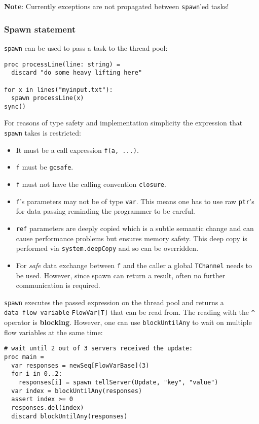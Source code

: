 \textbf{Note}: Currently exceptions are not propagated between
\texttt{spawn}'ed tasks!

\hypertarget{spawn-statement}{%
\subsubsection{Spawn statement}\label{spawn-statement}}

\texttt{spawn} can be used to pass a task to the thread pool:

\begin{verbatim}
proc processLine(line: string) =
  discard "do some heavy lifting here"

for x in lines("myinput.txt"):
  spawn processLine(x)
sync()
\end{verbatim}

For reasons of type safety and implementation simplicity the expression
that \texttt{spawn} takes is restricted:

\begin{itemize}
\tightlist
\item
  It must be a call expression \texttt{f(a,\ ...)}.
\item
  \texttt{f} must be \texttt{gcsafe}.
\item
  \texttt{f} must not have the calling convention \texttt{closure}.
\item
  \texttt{f}'s parameters may not be of type \texttt{var}. This means
  one has to use raw \texttt{ptr}'s for data passing reminding the
  programmer to be careful.
\item
  \texttt{ref} parameters are deeply copied which is a subtle semantic
  change and can cause performance problems but ensures memory safety.
  This deep copy is performed via \texttt{system.deepCopy} and so can be
  overridden.
\item
  For \emph{safe} data exchange between \texttt{f} and the caller a
  global \texttt{TChannel} needs to be used. However, since spawn can
  return a result, often no further communication is required.
\end{itemize}

\texttt{spawn} executes the passed expression on the thread pool and
returns a \texttt{data\ flow\ variable} \texttt{FlowVar{[}T{]}} that can
be read from. The reading with the \texttt{\^{}} operator is
\textbf{blocking}. However, one can use \texttt{blockUntilAny} to wait
on multiple flow variables at the same time:

\begin{verbatim}
# wait until 2 out of 3 servers received the update:
proc main =
  var responses = newSeq[FlowVarBase](3)
  for i in 0..2:
    responses[i] = spawn tellServer(Update, "key", "value")
  var index = blockUntilAny(responses)
  assert index >= 0
  responses.del(index)
  discard blockUntilAny(responses)
\end{verbatim}

